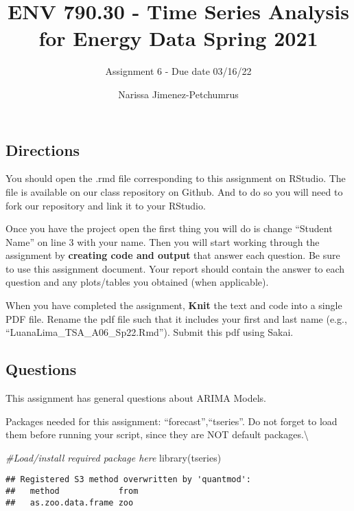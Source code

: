 \documentclass[
]{article}
\title{ENV 790.30 - Time Series Analysis for Energy Data \textbar{}
Spring 2021}
\subtitle{Assignment 6 - Due date 03/16/22}
\author{Narissa Jimenez-Petchumrus}
\date{}
\newenvironment{Shaded}{\begin{snugshade}}{\end{snugshade}}
\newcommand{\CommentTok}[1]{\textcolor[rgb]{0.56,0.35,0.01}{\textit{#1}}}
\newcommand{\FunctionTok}[1]{\textcolor[rgb]{0.00,0.00,0.00}{#1}}
\newcommand{\NormalTok}[1]{#1}
\begin{document}
\maketitle

\hypertarget{directions}{%
\subsection{Directions}\label{directions}}

You should open the .rmd file corresponding to this assignment on
RStudio. The file is available on our class repository on Github. And to
do so you will need to fork our repository and link it to your RStudio.

Once you have the project open the first thing you will do is change
``Student Name'' on line 3 with your name. Then you will start working
through the assignment by \textbf{creating code and output} that answer
each question. Be sure to use this assignment document. Your report
should contain the answer to each question and any plots/tables you
obtained (when applicable).

When you have completed the assignment, \textbf{Knit} the text and code
into a single PDF file. Rename the pdf file such that it includes your
first and last name (e.g., ``LuanaLima\_TSA\_A06\_Sp22.Rmd''). Submit
this pdf using Sakai.

\hypertarget{questions}{%
\subsection{Questions}\label{questions}}

This assignment has general questions about ARIMA Models.

Packages needed for this assignment: ``forecast'',``tseries''. Do not
forget to load them before running your script, since they are NOT
default packages.\textbackslash{}

\begin{Shaded}
\begin{Highlighting}[]
\CommentTok{\#Load/install required package here}
\FunctionTok{library}\NormalTok{(tseries)}
\end{Highlighting}
\end{Shaded}

\begin{verbatim}
## Registered S3 method overwritten by 'quantmod':
##   method            from
##   as.zoo.data.frame zoo
\end{verbatim}
\end{document}
